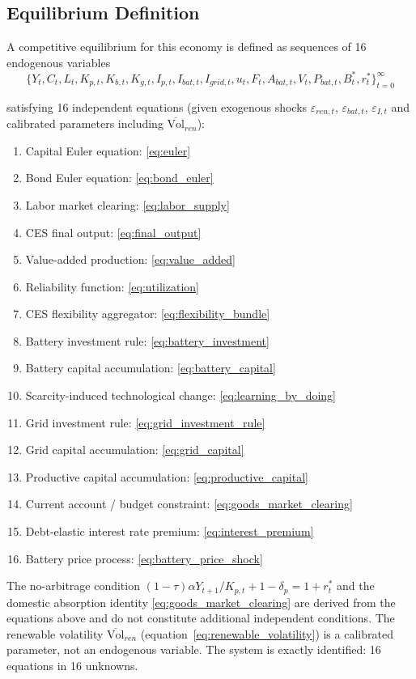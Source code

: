 	\subsection{Equilibrium Definition} \label{sec:equilibrium}

	A competitive equilibrium for this economy is defined as sequences of 16 endogenous variables
	$$\{Y_t, C_t, L_t, K_{p,t}, K_{b,t}, K_{g,t}, I_{p,t}, I_{bat,t}, I_{grid,t}, u_t, F_t, A_{bat,t}, V_t, P_{bat,t}, B^*_t, r^*_t\}_{t=0}^{\infty}$$

	satisfying 16 independent equations (given exogenous shocks $\varepsilon_{ren,t}$, $\varepsilon_{bat,t}$, $\varepsilon_{I,t}$ and calibrated parameters including $\overline{\text{Vol}}_{ren}$):

	\begin{enumerate}
		\item Capital Euler equation: \eqref{eq:euler}
		\item Bond Euler equation: \eqref{eq:bond_euler}
		\item Labor market clearing: \eqref{eq:labor_supply}
		\item CES final output: \eqref{eq:final_output}
		\item Value-added production: \eqref{eq:value_added}
		\item Reliability function: \eqref{eq:utilization}
		\item CES flexibility aggregator: \eqref{eq:flexibility_bundle}
		\item Battery investment rule: \eqref{eq:battery_investment}
		\item Battery capital accumulation: \eqref{eq:battery_capital}
		\item Scarcity-induced technological change: \eqref{eq:learning_by_doing}
		\item Grid investment rule: \eqref{eq:grid_investment_rule}
		\item Grid capital accumulation: \eqref{eq:grid_capital}
		\item Productive capital accumulation: \eqref{eq:productive_capital}
		\item Current account / budget constraint: \eqref{eq:goods_market_clearing}
		\item Debt-elastic interest rate premium: \eqref{eq:interest_premium}
		\item Battery price process: \eqref{eq:battery_price_shock}
	\end{enumerate}

	\noindent The no-arbitrage condition $(1-\tau)\alpha Y_{t+1}/K_{p,t}+1-\delta_p=1+r^*_t$ and the domestic absorption identity \eqref{eq:goods_market_clearing} are derived from the equations above and do not constitute additional independent conditions. The renewable volatility $\overline{\text{Vol}}_{ren}$ (equation~\ref{eq:renewable_volatility}) is a calibrated parameter, not an endogenous variable. The system is exactly identified: 16 equations in 16 unknowns.

